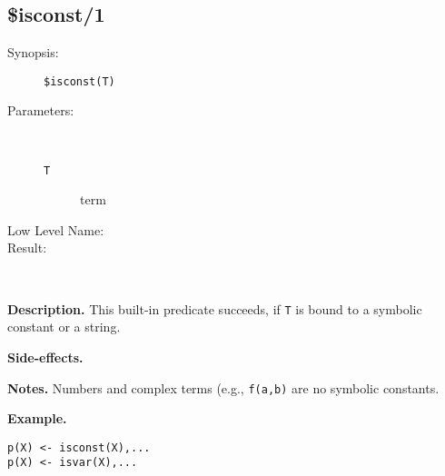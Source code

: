 %
%
%
\subsection{\$isconst/1}

\begin{description}
\item[Synopsis:]
	{\tt \$isconst(T)}
\item[Parameters:]\ \\[-0.5cm]
	\begin{description}
	\item[{\tt T}]
	term
	\end{description}
\item[Low Level Name:]
	{\tt }
\item[Result:]\ \\
\end{description}

\vspace*{0.5cm}
\noindent
{\bf Description.}
This built-in predicate succeeds, if {\tt T} is
bound to a symbolic constant or a string.

\vspace*{0.5cm}
\noindent
{\bf Side-effects.}

\vspace*{0.5cm}
\noindent
{\bf Notes.}
Numbers and complex terms (e.g., {\tt f(a,b)} are no symbolic constants.

\vspace*{0.5cm}
\noindent
{\bf Example.}
\begin{verbatim}
p(X) <- isconst(X),...
p(X) <- isvar(X),...
\end{verbatim}


